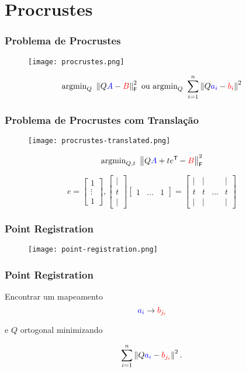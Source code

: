 
\section{Procrustes}

\begin{frame}[fragile]
  \frametitle{Problema de Procrustes}
  \begin{figure}
    \centering
    \texttt{[image: procrustes.png]}
  \end{figure}

  \[\text{argmin}_{Q}\,\, \left\lVert Q\textcolor{blue}{A} - \textcolor{red}{B}\right\rVert_\mathsf{F}^2 \text{  ou  } \text{argmin}_{Q}\,\, \sum_{i=1}^{n} \left\lVert Q\textcolor{blue}{a_i} - \textcolor{red}{b_i}\right\rVert^2\]
\end{frame}

\begin{frame}[fragile]
  \frametitle{Problema de Procrustes com Translação}
  \begin{figure}
    \centering
    \texttt{[image: procrustes-translated.png]}
  \end{figure}

  \[\text{argmin}_{Q,t}\,\, \left\lVert Q\textcolor{blue}{A} + t e^{\mathsf{T}\mkern-1mu} - \textcolor{red}{B}\right\rVert_\mathsf{F}^2\]

  \[e = \begin{bmatrix} 1 \\ \vdots \\ 1 \end{bmatrix}, \begin{bmatrix} \vert \\ t \\ \vert \end{bmatrix}\begin{bmatrix} 1 & \dots & 1 \end{bmatrix} = \begin{bmatrix} \vert & \vert & & \vert \\ t & t & \dots & t \\ \vert & \vert & & \vert \end{bmatrix}\]
\end{frame}

\begin{frame}
  \frametitle{Point Registration}
  \begin{figure}
      \centering
      \texttt{[image: point-registration.png]}
    \end{figure}
\end{frame}

\begin{frame}
  \frametitle{Point Registration}
  \begin{center}
    Encontrar um mapeamento \[\textcolor{blue}{a_i} \to \textcolor{red}{b_{j_{i}}}\]

    e $Q$ ortogonal minimizando

    \[\sum_{i=1}^{n} \left\lVert Q\textcolor{blue}{a_{i}} - \textcolor{red}{b_{j_{i}}}\right\rVert^2.\]
  \end{center}
\end{frame}

